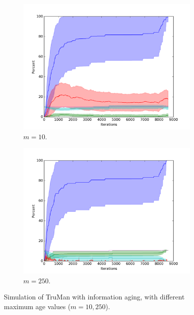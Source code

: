 \begin{figure}

\begin{subfigure}{0.5\textwidth}
\includegraphics[width=\linewidth]{images/plots/extra_malicious/1_10}
\caption{$m = 10$.} \label{fig:extra10}
\end{subfigure}
\hspace*{\fill} %
\begin{subfigure}{0.5\textwidth}
\includegraphics[width=\linewidth]{images/plots/extra_malicious/1_250}
\caption{$m = 250$.} \label{fig:extra250}
\end{subfigure}

\centering
\caption{Simulation of TruMan with information aging, with different maximum age values ($m=10, 250$).}
\label{fig:extramaliciousaging1}
\end{figure}

